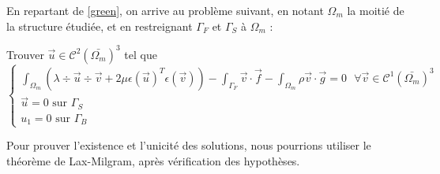 En repartant de \ref{green}, on arrive au problème suivant, en notant $\Omega_m$ la moitié de la structure étudiée, et en restreignant $\Gamma_F$ et $\Gamma_S$ à $\Omega_m$ :

Trouver $\vec{u} \in \mathcal{C}^2(\bar{\Omega_m})^3$ tel que
\begin{equation}\label{moitie}
    \begin{cases}
        \displaystyle\int_{\Omega_m} (\lambda \div \vec{u} \div \vec{v} + 2\mu \epsilon(\vec{u})^T \epsilon(\vec{v})) - \int_{\Gamma_F} \vec{v} \cdot \vec{f} - \int_{\Omega_m} \rho \vec{v} \cdot \vec{g} = 0 \textrm{ } \forall \vec{v} \in \mathcal{C}^1(\bar{\Omega_m})^3\\
        \vec{u} = 0 \textrm{ sur } \Gamma_S\\
        u_1 = 0 \textrm{ sur } \Gamma_B
    \end{cases}
\end{equation}

Pour prouver l'existence et l'unicité des solutions, nous pourrions utiliser le théorème de Lax-Milgram, après vérification des hypothèses.
